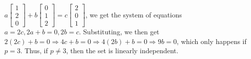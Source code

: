 \begin{ProbBox}
\begin{solution}
$a\begin{bmatrix}
  1\\[0.3em] 2\\[0.3em] 0
\end{bmatrix}
+
b\begin{bmatrix}
  0\\[0.3em] 1\\[0.3em] 2
\end{bmatrix}
=
c\begin{bmatrix}
  2\\[0.3em] 0\\[0.3em] 1
\end{bmatrix}$, we get the system of equations $a=2c, 2a+b=0, 2b=c$. Substituting, we then get $2(2c)+b=0 \Rightarrow 4c+b=0 \Rightarrow 4(2b)+b=0 \Rightarrow 9b=0$, which only happens if $p=3$. Thus, if $p \neq 3$, then the set is linearly independent. 

\end{solution}
\end{ProbBox}
\probskip

